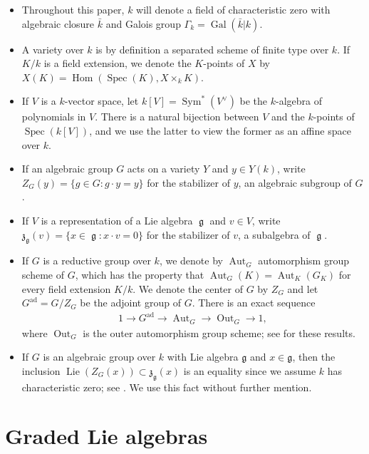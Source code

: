 \documentclass{article} %
\numberwithin{equation}{section}
\theoremstyle{definition}
\DeclareMathOperator{\lieg}{\mathfrak{g}}
\DeclareMathOperator{\Lie}{Lie}
\DeclareMathOperator{\Hom}{Hom}
\DeclareMathOperator{\Aut}{Aut}
\DeclareMathOperator{\Out}{Out}
\DeclareMathOperator{\Gal}{Gal}
\DeclareMathOperator{\Sym}{Sym}
\DeclareMathOperator{\Spec}{Spec}
\newcommand{\frakg}{\mathfrak g}
\newcommand{\frakz}{\mathfrak z}
\begin{document}
\begin{itemize}
    \item Throughout this paper, $k$ will denote a field of characteristic zero with algebraic closure $\bar{k}$ and Galois group $\Gamma_k = \Gal(\bar{k}|k)$.
    \item A variety over $k$ is by definition a separated scheme of finite type over $k$.
    If $K/k$ is a field extension, we denote the $K$-points of $X$ by $X(K) = \Hom(\Spec(K), X\times_k K)$.
    \item If $V$ is a $k$-vector space, let $k[V] = \Sym^*(V^{\vee})$ be the $k$-algebra of polynomials in $V$.
    There is a natural bijection between $V$ and the $k$-points of $\Spec(k[V])$, and we use the latter to view the former as an affine space over $k$. 
    \item If an algebraic group $G$ acts on a variety $Y$ and $y\in Y(k)$, write $Z_G(y) = \{g\in G\colon g\cdot y = y\}$ for the stabilizer of $y$, an algebraic subgroup of $G$.
    \item If $V$ is a representation of a Lie algebra $\lieg$ and $v\in V$, write $\frakz_{\lieg}(v) = \{x\in \lieg\colon x\cdot v= 0\}$ for the stabilizer of $v$, a subalgebra of $\lieg$.
    \item If $G$ is a reductive group over $k$, we denote by $\Aut_G$ automorphism group scheme of $G$, which has the property that $\Aut_G(K) = \Aut_K(G_K)$ for every field extension $K/k$.
    We denote the center of $G$ by $Z_G$ and let $G^{\mathrm{ad}} = G / Z_G$ be the adjoint group of $G$.
    There is an exact sequence
    \begin{align}
        1\rightarrow G^{\mathrm{ad}} \rightarrow \Aut_G \rightarrow \Out_G \rightarrow 1,
    \end{align}
    where $\Out_G$ is the outer automorphism group scheme; see \cite[Theorem 7.1.9]{Conrad-SGA} for these results.
    \item If $G$ is an algebraic group over $k$ with Lie algebra $\frakg$ and $x\in \frakg$, then the inclusion $\Lie(Z_G(x))  \subset \frakz_{\frakg}(x)$ is an equality since we assume $k$ has characteristic zero; see \cite[Proposition 1.10]{Humphreys-conjugacyclassesalgebraic}.
    We use this fact without further mention.
\end{itemize}


\section{Graded Lie algebras}\label{section: background}
\end{document}
